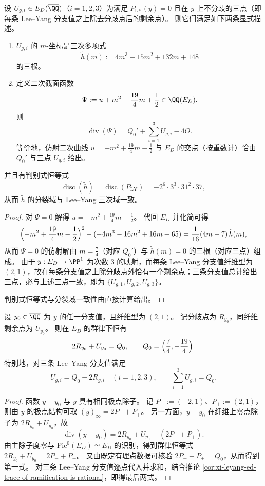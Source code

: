 \begin{theorem}\label{thm:xi-leyang-ed-parabola-cuts-unramified-companions}
设 \(U_{g,i}\in E_D(\overline\QQ)\)（\(i=1,2,3\)）为满足 \(P_{\mathrm{LY}}(y)=0\) 且在 \(y\) 上不分歧的三点（即每条 Lee--Yang 分支值之上除去分歧点后的剩余点）。
则它们满足如下两条显式描述。
\begin{enumerate}
  \item \(U_{g,i}\) 的 \(m\)-坐标是三次多项式
  \[
  \tilde h(m):=4m^3-15m^2+132m+148
  \]
  的三根。
  \item 定义二次截面函数
  \[
  \Psi:=u+m^2-\frac{19}{4}m+\frac12\in\QQ(E_D),
  \]
  则
  \[
  \operatorname{div}(\Psi)=Q_0'+\sum_{i=1}^3U_{g,i}-4O.
  \]
  等价地，仿射二次曲线 \(u=-m^2+\frac{19}{4}m-\frac12\) 与 \(E_D\) 的交点（按重数计）恰由 \(Q_0'\) 与三点 \(U_{g,i}\) 给出。
\end{enumerate}
并且有判别式恒等式
\[
\operatorname{disc}(\tilde h)=\operatorname{disc}(P_{\mathrm{LY}})=-2^6\cdot 3^3\cdot 31^2\cdot 37,
\]
从而 \(\tilde h\) 的分裂域与 Lee--Yang 三次域一致。
\end{theorem}
\begin{proof}
对 \(\Psi=0\) 解得 \(u=-m^2+\frac{19}{4}m-\frac12\)。
代回 \(E_D\) 并化简可得
\[
\Bigl(-m^2+\frac{19}{4}m-\frac12\Bigr)^2-(-4m^3-16m^2+16m+65)=\frac1{16}(4m-7)\,\tilde h(m),
\]
从而 \(\Psi=0\) 的仿射解由 \(m=\frac74\)（对应 \(Q_0'\)）与 \(\tilde h(m)=0\) 的三根（对应三点）组成。
由于 \(y:E_D\to\PP^1\) 为次数 \(3\) 的映射，而每条 Lee--Yang 分支值纤维型为 \((2,1)\)，故在每条分支值之上除分歧点外恰有一个剩余点；三条分支值总计给出三点，必与上述三点一致，即为 \(\{U_{g,1},U_{g,2},U_{g,3}\}\)。
\par
判别式恒等式与分裂域一致性由直接计算给出。
\end{proof}

\begin{proposition}[同一分支纤维中的群律约束]\label{prop:xi-leyang-ed-fiber-group-law-constraint}
设 \(y_0\in\overline\QQ\) 为 \(y\) 的任一分支值，且纤维型为 \((2,1)\)。
记分歧点为 \(R_{y_0}\)，同纤维剩余点为 \(U_{y_0}\)。
则在 \(E_D\) 的群律下恒有
\[
2R_{y_0}+U_{y_0}=Q_0,
\qquad
Q_0=\Bigl(\frac74,-\frac{19}4\Bigr).
\]
特别地，对三条 Lee--Yang 分支值满足
\[
U_{g,i}=Q_0-2R_{g,i}\quad(i=1,2,3),
\qquad
\sum_{i=1}^3U_{g,i}=Q_0.
\]
\end{proposition}
\begin{proof}
函数 \(y-y_0\) 与 \(y\) 具有相同极点除子。
记 \(P_-:=(-2,1)\)、\(P_+:=(2,1)\)，则由 \(y\) 的极点结构可取
\(
(y)_\infty=2P_-+P_+
\)。
另一方面，\(y-y_0\) 在纤维上零点除子为 \(2R_{y_0}+U_{y_0}\)，故
\[
\operatorname{div}(y-y_0)=2R_{y_0}+U_{y_0}-(2P_-+P_+).
\]
由主除子度零与 \(\mathrm{Pic}^0(E_D)\simeq E_D\) 的识别，得到群律恒等式
\(
2R_{y_0}+U_{y_0}=2P_-+P_+
\)。
又由既定有理点数据可核验 \(2P_-+P_+=Q_0\)，从而得到第一式。
对三条 Lee--Yang 分支值逐点代入并求和，结合推论 \ref{cor:xi-leyang-ed-trace-of-ramification-is-rational}，即得最后两式。
\end{proof}

